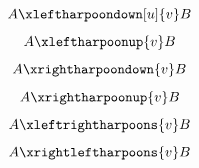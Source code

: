 \documentclass{article}
\begin{document}
\[ A \xleftharpoondown[u]{v} B \]
\[ A \xleftharpoonup{v} B \]
\[ A \xrightharpoondown{v} B \]
\[ A \xrightharpoonup{v} B \]
\[ A \xleftrightharpoons{v} B \]
\[ A \xrightleftharpoons{v} B \]
\end{document}
